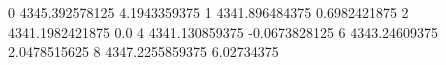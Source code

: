 0 4345.392578125 4.1943359375
1 4341.896484375 0.6982421875
2 4341.1982421875 0.0
4 4341.130859375 -0.0673828125
6 4343.24609375 2.0478515625
8 4347.2255859375 6.02734375
